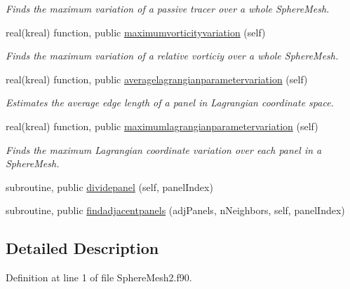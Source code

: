\begin{DoxyCompactItemize}
\begin{DoxyCompactList}\small\item\em Finds the maximum variation of a passive tracer over a whole Sphere\+Mesh. \end{DoxyCompactList}\item 
real(kreal) function, public \hyperlink{group__SphereMesh_gaae2d1cf4ffc3bae54040cbeea7b7d0be}{maximumvorticityvariation} (self)
\begin{DoxyCompactList}\small\item\em Finds the maximum variation of a relative vorticiy over a whole Sphere\+Mesh. \end{DoxyCompactList}\item 
real(kreal) function, public \hyperlink{group__SphereMesh_gaa98d1a869045c29e59c388b3defd5267}{averagelagrangianparametervariation} (self)
\begin{DoxyCompactList}\small\item\em Estimates the average edge length of a panel in Lagrangian coordinate space. \end{DoxyCompactList}\item 
real(kreal) function, public \hyperlink{group__SphereMesh_ga27be9c6a5c086d37db3dd65c2c8ec37b}{maximumlagrangianparametervariation} (self)
\begin{DoxyCompactList}\small\item\em Finds the maximum Lagrangian coordinate variation over each panel in a Sphere\+Mesh. \end{DoxyCompactList}\item 
subroutine, public \hyperlink{classspheremeshmodule_a8178d3931d36fed89706bdbcb071b69b}{dividepanel} (self, panel\+Index)
\item 
subroutine, public \hyperlink{classspheremeshmodule_a40ef1c43bfb85ce697ddf617209a3886}{findadjacentpanels} (adj\+Panels, n\+Neighbors, self, panel\+Index)
\end{DoxyCompactItemize}


\subsection{Detailed Description}


Definition at line 1 of file Sphere\+Mesh2.\+f90.



